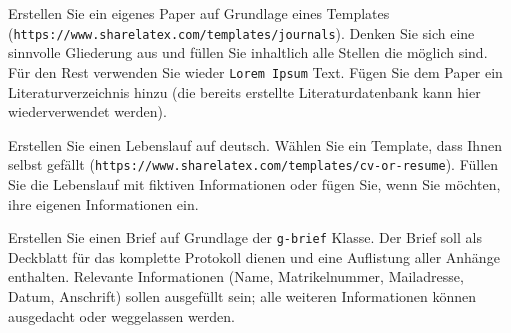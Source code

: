 \begin{aufgabe}
Erstellen Sie ein eigenes Paper auf Grundlage eines Templates\\
(\texttt{https://www.sharelatex.com/templates/journals}). Denken Sie sich
eine sinnvolle Gliederung aus und f\"ullen Sie inhaltlich alle Stellen die
m\"oglich sind. F\"ur den Rest verwenden Sie wieder \texttt{Lorem Ipsum}
Text. F\"ugen Sie dem Paper ein Literaturverzeichnis hinzu (die bereits
erstellte Literaturdatenbank kann hier wiederverwendet werden).
\end{aufgabe}

\begin{aufgabe}
Erstellen Sie einen Lebenslauf auf deutsch. W\"ahlen Sie ein Template, dass
Ihnen selbst gef\"allt
(\texttt{https://www.sharelatex.com/templates/cv-or-resume}). F\"ullen Sie die
Lebenslauf mit fiktiven Informationen oder f\"ugen Sie, wenn Sie m\"ochten,
ihre eigenen Informationen ein.

\end{aufgabe}

\begin{aufgabe}
Erstellen Sie einen Brief auf Grundlage der \texttt{g-brief} Klasse. Der
Brief soll als Deckblatt f\"ur das komplette Protokoll dienen und eine
Auflistung aller Anh\"ange enthalten. Relevante Informationen (Name,
Matrikelnummer, Mailadresse, Datum, Anschrift) sollen ausgef\"ullt sein;
alle weiteren Informationen k\"onnen ausgedacht oder weggelassen werden.
\end{aufgabe}